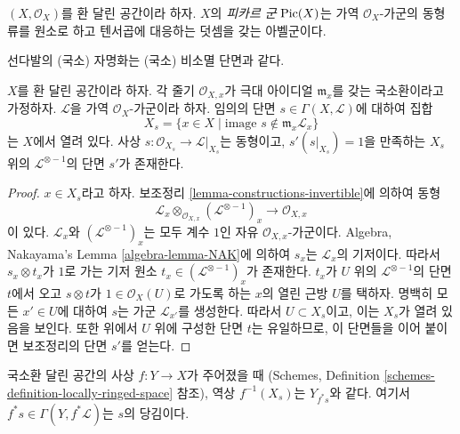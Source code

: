 \begin{definition}
\label{definition-pic}
$(X, \mathcal{O}_X)$를 환 달린 공간이라 하자.
$X$의 {\it 피카르 군} $\mathop{\mathrm{Pic}}\nolimits(X)$는 가역 $\mathcal{O}_X$-가군의
동형류를 원소로 하고 텐서곱에 대응하는 덧셈을 갖는 아벨군이다.
\end{definition}

\begin{lemma}
\label{lemma-s-open}
\begin{slogan}
선다발의 (국소) 자명화는 (국소) 비소멸 단면과 같다.
\end{slogan}
$X$를 환 달린 공간이라 하자. 각 줄기 $\mathcal{O}_{X, x}$가
극대 아이디얼 $\mathfrak m_x$를 갖는 국소환이라고 가정하자.
$\mathcal{L}$을 가역 $\mathcal{O}_X$-가군이라 하자.
임의의 단면 $s \in \Gamma(X, \mathcal{L})$에 대하여 집합
$$
X_s = \{x \in X \mid \text{image }s \not\in \mathfrak m_x\mathcal{L}_x\}
$$
는 $X$에서 열려 있다. 사상
$s : \mathcal{O}_{X_s} \to \mathcal{L}|_{X_s}$는 동형이고,
$s' (s|_{X_s}) = 1$을 만족하는 $X_s$ 위의
$\mathcal{L}^{\otimes -1}$의 단면 $s'$가 존재한다.
\end{lemma}

\begin{proof}
$x \in X_s$라고 하자. 보조정리 \ref{lemma-constructions-invertible}에
의하여 동형
$$
\mathcal{L}_x \otimes_{\mathcal{O}_{X, x}} (\mathcal{L}^{\otimes -1})_x
\longrightarrow
\mathcal{O}_{X, x}
$$
이 있다. $\mathcal{L}_x$와 $(\mathcal{L}^{\otimes -1})_x$는 모두
계수 $1$인 자유 $\mathcal{O}_{X, x}$-가군이다. Algebra,
Nakayama's Lemma \ref{algebra-lemma-NAK}에 의하여
$s_x$는 $\mathcal{L}_x$의 기저이다. 따라서
$s_x \otimes t_x$가 $1$로 가는 기저 원소
$t_x \in (\mathcal{L}^{\otimes -1})_x$가 존재한다.
$t_x$가 $U$ 위의 $\mathcal{L}^{\otimes -1}$의 단면 $t$에서 오고
$s \otimes t$가 $1 \in \mathcal{O}_X(U)$로 가도록 하는
$x$의 열린 근방 $U$를 택하자. 명백히 모든 $x' \in U$에 대하여
$s$는 가군 $\mathcal{L}_{x'}$를 생성한다. 따라서 $U \subset X_s$이고,
이는 $X_s$가 열려 있음을 보인다. 또한 위에서 $U$ 위에 구성한 단면
$t$는 유일하므로, 이 단면들을 이어 붙이면 보조정리의 단면 $s'$를 얻는다.
\end{proof}

\begin{remark}
\label{remark-pullback-s-open}
국소환 달린 공간의 사상 $f : Y \to X$가 주어졌을 때
(Schemes, Definition \ref{schemes-definition-locally-ringed-space} 참조),
역상 $f^{-1}(X_s)$는 $Y_{f^*s}$와 같다. 여기서
$f^*s \in \Gamma(Y, f^*\mathcal{L})$는 $s$의 당김이다.
\end{remark}


